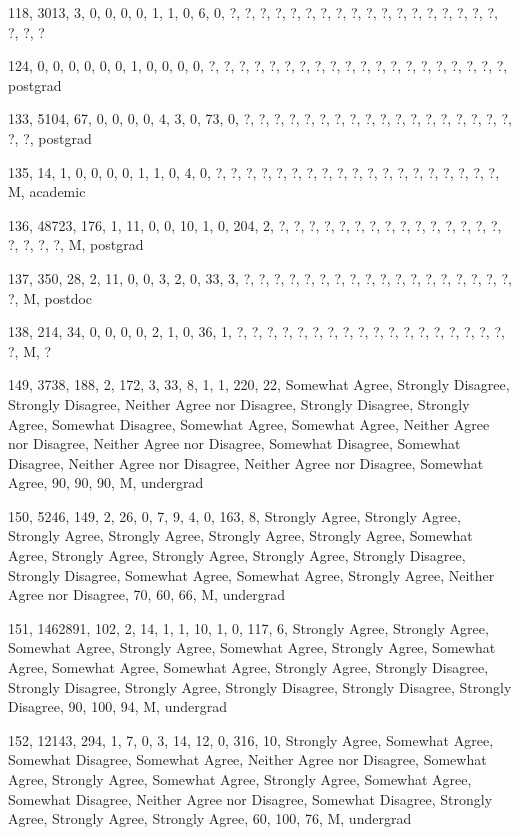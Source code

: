 \documentclass[12pt,twoside]{article}
\begin{document}
118, 3013, 3, 0, 0, 0, 0, 1, 1, 0, 6, 0, ?, ?, ?, ?, ?, ?, ?, ?, ?, ?,
?, ?, ?, ?, ?, ?, ?, ?, ?, ?, ?

124, 0, 0, 0, 0, 0, 0, 1, 0, 0, 0, 0, ?, ?, ?, ?, ?, ?, ?, ?, ?, ?, ?,
?, ?, ?, ?, ?, ?, ?, ?, ?, postgrad

133, 5104, 67, 0, 0, 0, 0, 4, 3, 0, 73, 0, ?, ?, ?, ?, ?, ?, ?, ?, ?, ?,
?, ?, ?, ?, ?, ?, ?, ?, ?, ?, postgrad

135, 14, 1, 0, 0, 0, 0, 1, 1, 0, 4, 0, ?, ?, ?, ?, ?, ?, ?, ?, ?, ?, ?,
?, ?, ?, ?, ?, ?, ?, ?, M, academic

136, 48723, 176, 1, 11, 0, 0, 10, 1, 0, 204, 2, ?, ?, ?, ?, ?, ?, ?, ?,
?, ?, ?, ?, ?, ?, ?, ?, ?, ?, ?, M, postgrad

137, 350, 28, 2, 11, 0, 0, 3, 2, 0, 33, 3, ?, ?, ?, ?, ?, ?, ?, ?, ?, ?,
?, ?, ?, ?, ?, ?, ?, ?, ?, M, postdoc

138, 214, 34, 0, 0, 0, 0, 2, 1, 0, 36, 1, ?, ?, ?, ?, ?, ?, ?, ?, ?, ?,
?, ?, ?, ?, ?, ?, ?, ?, ?, M, ?

149, 3738, 188, 2, 172, 3, 33, 8, 1, 1, 220, 22, Somewhat Agree,
Strongly Disagree, Strongly Disagree, Neither Agree nor Disagree,
Strongly Disagree, Strongly Agree, Somewhat Disagree, Somewhat Agree,
Somewhat Agree, Neither Agree nor Disagree, Neither Agree nor Disagree,
Somewhat Disagree, Somewhat Disagree, Neither Agree nor Disagree,
Neither Agree nor Disagree, Somewhat Agree, 90, 90, 90, M, undergrad

150, 5246, 149, 2, 26, 0, 7, 9, 4, 0, 163, 8, Strongly Agree, Strongly
Agree, Strongly Agree, Strongly Agree, Strongly Agree, Strongly Agree,
Somewhat Agree, Strongly Agree, Strongly Agree, Strongly Agree,
Strongly Disagree, Strongly Disagree, Somewhat Agree, Somewhat Agree,
Strongly Agree, Neither Agree nor Disagree, 70, 60, 66, M, undergrad

151, 1462891, 102, 2, 14, 1, 1, 10, 1, 0, 117, 6, Strongly Agree,
Strongly Agree, Somewhat Agree, Strongly Agree, Somewhat Agree,
Strongly Agree, Somewhat Agree, Somewhat Agree, Somewhat Agree,
Strongly Agree, Strongly Disagree, Strongly Disagree, Strongly Agree,
Strongly Disagree, Strongly Disagree, Strongly Disagree, 90, 100, 94,
M, undergrad

152, 12143, 294, 1, 7, 0, 3, 14, 12, 0, 316, 10, Strongly Agree,
Somewhat Agree, Somewhat Disagree, Somewhat Agree, Neither Agree nor
Disagree, Somewhat Agree, Strongly Agree, Somewhat Agree, Strongly
Agree, Somewhat Agree, Somewhat Disagree, Neither Agree nor Disagree,
Somewhat Disagree, Strongly Agree, Strongly Agree, Strongly Agree, 60,
100, 76, M, undergrad
\end{document}
